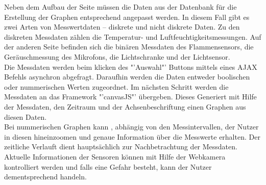 Neben dem Aufbau der Seite müssen die Daten aus der Datenbank für die Erstellung der Graphen entsprechend angepasst werden. In diesem Fall gibt es zwei Arten von Messwertdaten  – diskrete und nicht diskrete Daten. Zu den diskreten Messdaten zählen die Temperatur- und Luftfeuchtigkeitsmessungen. Auf der anderen Seite befinden sich die binären Messdaten des Flammensensors, die Geräuschmessung des Mikrofons, die Lichtschranke und der Lichtsensor.\\
Die Messdaten werden beim klicken des "'Auswahl"' Buttons mittels eines \ac{AJAX} Befehls asynchron abgefragt. Daraufhin werden die Daten entweder boolischen oder nummerischen Werten zugeordnet. Im nächsten Schritt werden die Messdaten an das Framework "'canvasJS"' übergeben. Dieses Generiert mit Hilfe der Messdaten, den Zeitraum und der Achsenbeschriftung einen Graphen aus diesen Daten.\\
Bei nummerischen Graphen kann , abhängig von den Messintervallen, der Nutzer in diesen hineinzoomen und genaue Information über die Messwerte erhalten. Der zeitliche Verlauft dient hauptsächlich zur Nachbetrachtung der Messdaten.\\
Aktuelle Informationen der Sensoren können mit Hilfe der Webkamera kontrolliert werden und falls eine Gefahr besteht, kann der Nutzer dementsprechend handeln.
